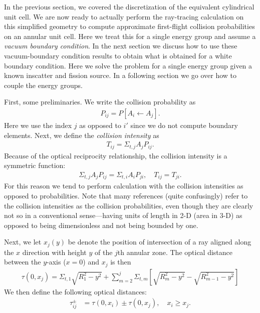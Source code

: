 In the previous section, we covered the discretization of the equivalent cylindrical unit cell. We are now ready to actually perform the ray-tracing calculation on this simplified geometry to compute approximate first-flight collision probabilities on an annular unit cell. Here we treat this for a single energy group and assume a \emph{vacuum boundary condition}. In the next section we discuss how to use these vacuum-boundary condition results to obtain what is obtained for a white boundary condition. Here we solve the problem for a single energy group given a known inscatter and fission source. In a following section we go over how to couple the energy groups.

First, some preliminaries. We write the collision probability as
\begin{align}
  P_{ij} = P[ A_i \leftarrow A_j ] .
\end{align}
Here we use the index $j$ as opposed to $i'$ since we do not compute boundary elements. Next, we define the \emph{collision intensity} as
\begin{align}
  T_{ij} = \Sigma_{t,j} A_j P_{ij} .
\end{align}
Because of the optical reciprocity relationship, the collision intensity is a symmetric function:
\begin{align}
  \Sigma_{t,j} A_j P_{ij} = \Sigma_{t,i} A_i P_{ji}, \quad T_{ij} = T_{ji} .
\end{align}
For this reason we tend to perform calculation with the collision intensities as opposed to probabilities. Note that many references (quite confusingly) refer to the collision intensities as the collision probabilities, even though they are clearly not so in a conventional sense---having units of length in 2-D (area in 3-D) as opposed to being dimensionless and not being bounded by one.

Next, we let $x_j(y)$ be denote the position of intersection of a ray aligned along the $x$ direction with height $y$ of the $j$th annular zone. The optical distance between the $y$-axis ($x = 0$) and $x_j$ is then
\begin{align}
  \tau(0,x_j) = \Sigma_{t,1}  \sqrt{ R_1^2 - y^2 } +  \sum_{m=2}^j \Sigma_{t,m} \left[ \sqrt{ R_m^2 - y^2 } - \sqrt{ R_{m-1}^2 - y^2 } \right]
\end{align}
We then define the following optical distances:
\begin{align}
  \tau_{ij}^\pm &= \tau(0,x_i) \pm \tau(0,x_j) , \quad x_i \ge x_j .
\end{align}


